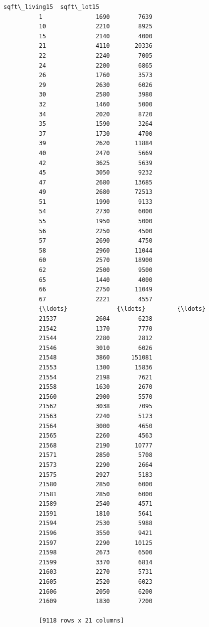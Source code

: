 \documentclass[11pt]{article}
\begin{document}
\begin{Verbatim}[commandchars=\\\{\}]
                 sqft\_living15  sqft\_lot15  
          1               1690        7639  
          10              2210        8925  
          15              2140        4000  
          21              4110       20336  
          22              2240        7005  
          24              2200        6865  
          26              1760        3573  
          29              2630        6026  
          30              2580        3980  
          32              1460        5000  
          34              2020        8720  
          35              1590        3264  
          37              1730        4700  
          39              2620       11884  
          40              2470        5669  
          42              3625        5639  
          45              3050        9232  
          47              2680       13685  
          49              2680       72513  
          51              1990        9133  
          54              2730        6000  
          55              1950        5000  
          56              2250        4500  
          57              2690        4750  
          58              2960       11044  
          60              2570       18900  
          62              2500        9500  
          65              1440        4000  
          66              2750       11049  
          67              2221        4557  
          {\ldots}              {\ldots}         {\ldots}  
          21537           2604        6238  
          21542           1370        7770  
          21544           2280        2812  
          21546           3010        6026  
          21548           3860      151081  
          21553           1300       15836  
          21554           2198        7621  
          21558           1630        2670  
          21560           2900        5570  
          21562           3038        7095  
          21563           2240        5123  
          21564           3000        4650  
          21565           2260        4563  
          21568           2190       10777  
          21571           2850        5708  
          21573           2290        2664  
          21575           2927        5183  
          21580           2850        6000  
          21581           2850        6000  
          21589           2540        4571  
          21591           1810        5641  
          21594           2530        5988  
          21596           3550        9421  
          21597           2290       10125  
          21598           2673        6500  
          21599           3370        6814  
          21603           2270        5731  
          21605           2520        6023  
          21606           2050        6200  
          21609           1830        7200  
          
          [9118 rows x 21 columns]
\end{Verbatim}
            
\end{document}
